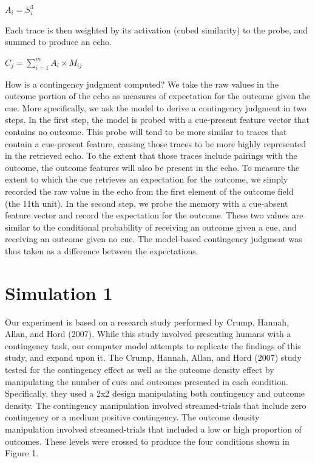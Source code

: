 \documentclass[
  english,
  man,floatsintext]{apa6}
\begin{document}
\(A_i = S_i^3\)

Each trace is then weighted by its activation (cubed similarity) to the probe, and summed to produce an echo.

\(C_j = \sum_{i=1}^m A_i \times M_{ij}\)

How is a contingency judgment computed? We take the raw values in the outcome portion of the echo as measures of expectation for the outcome given the cue. More specifically, we ask the model to derive a contingency judgment in two steps. In the first step, the model is probed with a cue-present feature vector that contains no outcome. This probe will tend to be more similar to traces that contain a cue-present feature, causing those traces to be more highly represented in the retrieved echo. To the extent that those traces include pairings with the outcome, the outcome features will also be present in the echo. To measure the extent to which the cue retrieves an expectation for the outcome, we simply recorded the raw value in the echo from the first element of the outcome field (the 11th unit). In the second step, we probe the memory with a cue-absent feature vector and record the expectation for the outcome. These two values are similar to the conditional probability of receiving an outcome given a cue, and receiving an outcome given no cue. The model-based contingency judgment was thus taken as a difference between the expectations.

\hypertarget{simulation-1}{%
\section{Simulation 1}\label{simulation-1}}

Our experiment is based on a research study performed by Crump, Hannah, Allan, and Hord (2007). While this study involved presenting humans with a contingency task, our computer model attempts to replicate the findings of this study, and expand upon it. The Crump, Hannah, Allan, and Hord (2007) study tested for the contingency effect as well as the outcome density effect by manipulating the number of cues and outcomes presented in each condition. Specifically, they used a 2x2 design manipulating both contingency and outcome density. The contingency manipulation involved streamed-trials that include zero contingency or a medium positive contingency. The outcome density manipulation involved streamed-trials that included a low or high proportion of outcomes. These levels were crossed to produce the four conditions shown in Figure 1.
\end{document}
